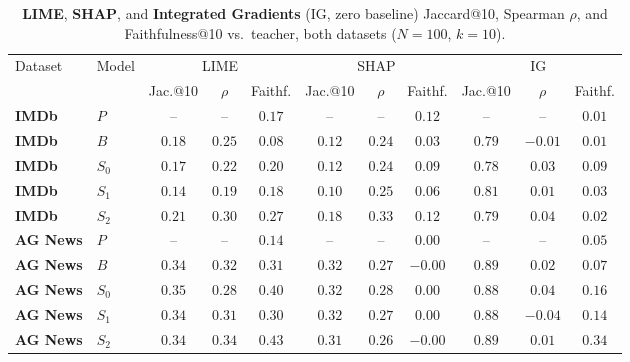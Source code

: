 \documentclass[conference]{IEEEtran}
\begin{document}
\begin{table}[tb]
\centering
\caption{\textbf{LIME}, \textbf{SHAP}, and \textbf{Integrated Gradients} (IG, zero baseline) Jaccard@10, Spearman $\rho$, and Faithfulness@10 vs.\ teacher, both datasets ($N=100$, $k=10$).}
\footnotesize
\begin{tabular}{|l|l|c|c|c|c|c|c|c|c|c|}
\hline
\multirow{2}{*}{Dataset} & \multirow{2}{*}{Model} & \multicolumn{3}{c|}{LIME} & \multicolumn{3}{c|}{SHAP} & \multicolumn{3}{c|}{IG} \\
\cline{3-11}
 & & Jac.@10 & $\rho$ & Faithf. & Jac.@10 & $\rho$ & Faithf. & Jac.@10 & $\rho$ & Faithf. \\ \hline
\textbf{IMDb} & $P$ & -- & -- & $0.17$ & -- & -- & $0.12$ & -- & -- & $0.01$ \\
\textbf{IMDb} & $B$ & $0.18$ & $0.25$ & $0.08$ & $0.12$ & $0.24$ & $0.03$ & $0.79$ & $-0.01$ & $0.01$ \\
\textbf{IMDb} & $S_0$ & $0.17$ & $0.22$ & $0.20$ & $0.12$ & $0.24$ & $0.09$ & $0.78$ & $0.03$ & $0.09$ \\
\textbf{IMDb} & $S_1$ & $0.14$ & $0.19$ & $0.18$ & $0.10$ & $0.25$ & $0.06$ & $0.81$ & $0.01$ & $0.03$ \\
\textbf{IMDb} & $S_2$ & $0.21$ & $0.30$ & $0.27$ & $0.18$ & $0.33$ & $0.12$ & $0.79$ & $0.04$ & $0.02$ \\
\hline
\textbf{AG News} & $P$ & -- & -- & $0.14$ & -- & -- & $0.00$ & -- & -- & $0.05$ \\
\textbf{AG News} & $B$ & $0.34$ & $0.32$ & $0.31$ & $0.32$ & $0.27$ & $-0.00$ & $0.89$ & $0.02$ & $0.07$ \\
\textbf{AG News} & $S_0$ & $0.35$ & $0.28$ & $0.40$ & $0.32$ & $0.28$ & $0.00$ & $0.88$ & $0.04$ & $0.16$ \\
\textbf{AG News} & $S_1$ & $0.34$ & $0.31$ & $0.30$ & $0.32$ & $0.27$ & $0.00$ & $0.88$ & $-0.04$ & $0.14$ \\
\textbf{AG News} & $S_2$ & $0.34$ & $0.34$ & $0.43$ & $0.31$ & $0.26$ & $-0.00$ & $0.89$ & $0.01$ & $0.34$ \\ \hline
\end{tabular}
\label{tab:explanation_metrics}
\end{table}
\end{document}
